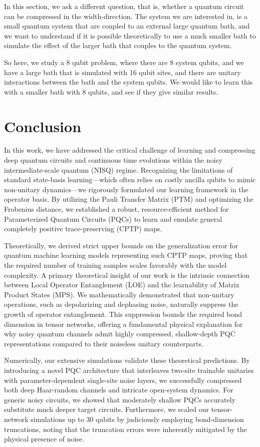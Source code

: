 \documentclass[%
 reprint,
superscriptaddress,
 amsmath,amssymb,
 aps,
]{revtex4-2}
\begin{document}
In this section, we ask a different question, that is, whether a quantum circuit can be compressed in the width-direction. The system we are interested in, is a small quantum system that are coupled to an external large quantum bath, and we want to understand if it is possible theoretically to use a much smaller bath to simulate the effect of the larger bath that couples to the quantum system.

So here, we study a 8 qubit problem, where there are 8 system qubits, and we have a large bath that is simulated with 16 qubit sites, and there are unitary interactions between the bath and the system qubits. We would like to learn this with a smaller bath with 8 qubits, and see if they give similar results.

\section{Conclusion}

In this work, we have addressed the critical challenge of learning and compressing deep quantum circuits and continuous time evolutions within the noisy intermediate-scale quantum (NISQ) regime. Recognizing the limitations of standard state-basis learning---which often relies on costly ancilla qubits to mimic non-unitary dynamics---we rigorously formulated our learning framework in the operator basis. By utilizing the Pauli Transfer Matrix (PTM) and optimizing the Frobenius distance, we established a robust, resource-efficient method for Parameterized Quantum Circuits (PQCs) to learn and emulate general completely positive trace-preserving (CPTP) maps.

Theoretically, we derived strict upper bounds on the generalization error for quantum machine learning models representing such CPTP maps, proving that the required number of training samples scales favorably with the model complexity. A primary theoretical insight of our work is the intrinsic connection between Local Operator Entanglement (LOE) and the learnability of Matrix Product States (MPS). We mathematically demonstrated that non-unitary operations, such as depolarizing and dephasing noise, naturally suppress the growth of operator entanglement. This suppression bounds the required bond dimension in tensor networks, offering a fundamental physical explanation for why noisy quantum channels admit highly compressed, shallow-depth PQC representations compared to their noiseless unitary counterparts.

Numerically, our extensive simulations validate these theoretical predictions. By introducing a novel PQC architecture that interleaves two-site trainable unitaries with parameter-dependent single-site noise layers, we successfully compressed both deep Haar-random channels and intricate open-system dynamics. For generic noisy circuits, we showed that moderately shallow PQCs accurately substitute much deeper target circuits. Furthermore, we scaled our tensor-network simulations up to 30 qubits by judiciously employing bond-dimension truncations, noting that the truncation errors were inherently mitigated by the physical presence of noise. 
\end{document}
